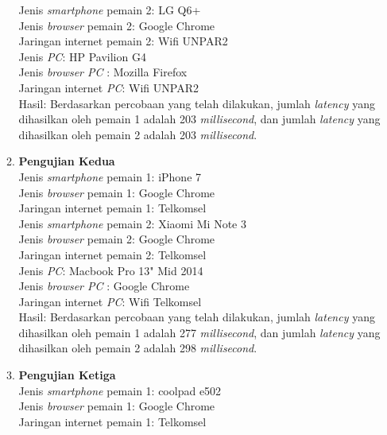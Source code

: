\begin{enumerate}
\begin{enumerate}
		Jenis \textit{smartphone} pemain 2: LG Q6+\\
		Jenis \textit{browser} pemain 2: Google Chrome\\
		Jaringan internet pemain 2: Wifi UNPAR2\\
		
		Jenis \textit{PC}: HP Pavilion G4\\
		Jenis \textit{browser PC} : Mozilla Firefox\\
		Jaringan internet \textit{PC}: Wifi UNPAR2\\
		
		Hasil: Berdasarkan percobaan yang telah dilakukan, jumlah \textit{latency} yang dihasilkan oleh pemain 1 adalah 203 \textit{millisecond}, dan jumlah \textit{latency} yang dihasilkan oleh pemain 2 adalah 203 \textit{millisecond}.
		
		\item \textbf{Pengujian Kedua} \\ 
		Jenis \textit{smartphone} pemain 1: iPhone 7\\
		Jenis \textit{browser} pemain 1: Google Chrome\\
		Jaringan internet pemain 1: Telkomsel\\
		
		Jenis \textit{smartphone} pemain 2: Xiaomi Mi Note 3\\
		Jenis \textit{browser} pemain 2: Google Chrome\\
		Jaringan internet pemain 2: Telkomsel\\
		
		Jenis \textit{PC}: Macbook Pro 13" Mid 2014\\
		Jenis \textit{browser PC} : Google Chrome\\
		Jaringan internet \textit{PC}: Wifi Telkomsel\\
		
		Hasil: Berdasarkan percobaan yang telah dilakukan, jumlah \textit{latency} yang dihasilkan oleh pemain 1 adalah 277 \textit{millisecond}, dan jumlah \textit{latency} yang dihasilkan oleh pemain 2 adalah 298 \textit{millisecond}.
		
		\item \textbf{Pengujian Ketiga} \\ 
		Jenis \textit{smartphone} pemain 1: coolpad e502\\
		Jenis \textit{browser} pemain 1: Google Chrome\\
		Jaringan internet pemain 1: Telkomsel\\
		

\end{enumerate}
\end{enumerate}
